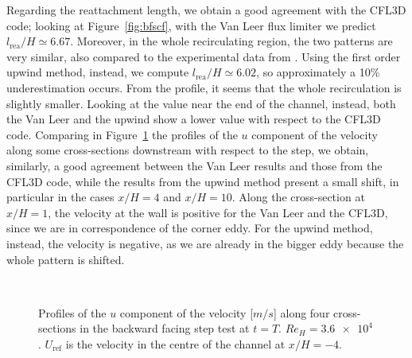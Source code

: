 Regarding the reattachment length, we obtain a good agreement with the 
CFL3D code; looking at Figure~\ref{fig:bfscf}, with the Van Leer flux 
limiter we predict $l_\text{rea} /H \simeq 6.67$. Moreover, in the whole 
recirculating region, the two patterns are very similar, also compared to the 
experimental data from \cite{bfs:driver}. Using the first order upwind method, 
instead, we compute $l_\text{rea} /H \simeq 6.02$, so approximately a 10\% 
underestimation occurs. From the profile, it seems that the whole recirculation 
is slightly smaller. Looking at the value near the end of the channel, instead, 
both the Van Leer and the upwind show a lower value with respect to the CFL3D 
code. Comparing in Figure~\ref{fig:bfscomp} the profiles of the $u$ component 
of the velocity along some cross-sections downstream with respect to the step, 
we obtain, similarly, a good agreement between the Van Leer results and those 
from the CFL3D code, while the results from the upwind method present a small 
shift, in particular in the cases $x/H=4$ and $x/H=10$. Along the cross-section 
at $x/H=1$, the velocity at the wall is positive for the Van Leer and the 
CFL3D, since we are in correspondence of the corner eddy. For the upwind 
method, instead, the velocity is negative, as we are already in the bigger eddy 
because the whole pattern is shifted.
\begin{figure}
	\centering
	\subfloat[$x/H=-4$]{}
	\subfloat[$x/H=1$]{}\\
	\subfloat[$x/H=4$]{}
	\subfloat[$x/H=10$]{}
	\caption[Velocity profiles in the backward facing step test]{Profiles of 
	the $u$ component of the velocity [$\si{m/s}$] along four cross-sections in 
	the backward facing step test at $t=T$. $Re_H=\num{3.6e4}$. $U_\text{ref}$ 
	is the velocity in the centre of the channel at $x/H=-4$.}
	\label{fig:bfscomp}
\end{figure}
